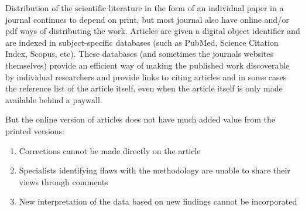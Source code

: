 \documentclass[final,authoryear,3p]{elsarticle-open-drafting}
\begin{document}
Distribution of the scientific literature in the form of an individual paper in a journal continues to depend on print, but most journal also have online and/or pdf ways of distributing the work. Articles are given a digital object identifier and are indexed in subject-specific databases (such as PubMed, Science Citation Index, Scopus, etc). These databases (and sometimes the journals websites themselves) provide an efficient way of making the published work discoverable by individual researchers and provide links to citing articles and in some cases the reference list of the article itself, even when the article itself is only made available behind a paywall. 

But the online version of articles does not have much added value from the printed versions:
\begin{enumerate}
\item Corrections cannot be made directly on the article 
\item Specialists identifying flaws with the methodology are unable to share their views through comments
\item New interpretation of the data based on new findings cannot be incorporated
\end{enumerate}
\end{document}

